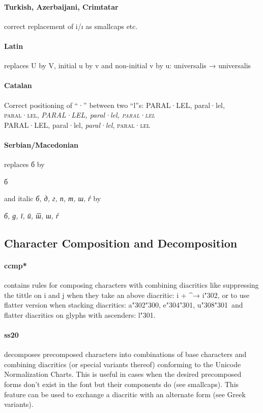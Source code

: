 \documentclass[pagesize,DIV14]{scrartcl}
\begin{document}
\paragraph*{Turkish, Azerbaijani, Crimtatar} correct replacement of i/ı as smallcaps etc.
\paragraph*{Latin} replaces U by V, initial u by v and non-initial v by u: universalis → { universalis}
\paragraph*{Catalan} Correct positioning of “·” between two “l”s: {PARAL·LEL, paral·lel, \textsc{paral·lel}, \textit{PARAL·LEL, paral·lel, \textsc{paral·lel}}\\{\scriptsize PARAL·LEL, paral·lel, \textit{paral·lel}, \textsc{paral·lel}}}
\paragraph*{Serbian/Macedonian} replaces б by \begin{serbian}б\end{serbian} and italic \textit{б, д, г, п, т, ш, ѓ} by \begin{serbian}\itshape б, д, г, п, т, ш, ѓ\end{serbian}

\subsection{Character Composition and Decomposition}
\paragraph*{ccmp*} contains rules for composing characters with combining diacritics like suppressing the tittle on i and j when they take an above diacritic: i + \textasciicircum → i\char"302, or to use flatter version when stacking diacritics: a\char"302\char"300, e\char"304\char"301, u\char"308\char"301\ and flatter diacritics on glyphs with ascenders: l\char"301.
\paragraph*{ss20} decomposes precomposed characters into combinations of base characters and combining diacritics (or special variants thereof) conforming to the Unicode Normalization Charts. This is useful in cases when the desired precomposed forms don’t exist in the font but their components do (see smallcaps). This feature can be used to exchange a diacritic with an alternate form (see Greek variants).
\end{document}
